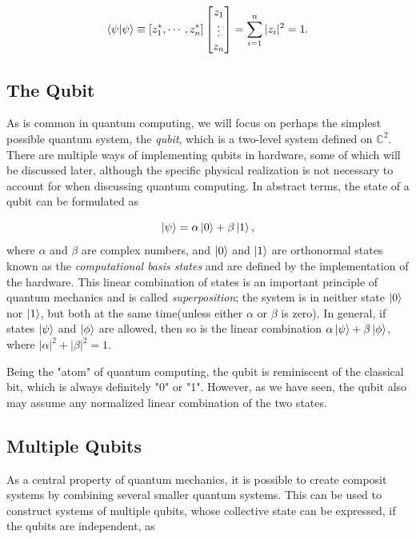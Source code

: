 \begin{equation}
    \braket{\psi}{\psi} \equiv [z_1^*, \cdots, z_n^*] 
    \begin{bmatrix}
        z_{1} \\
        \vdots \\
        z_{n}
    \end{bmatrix}
    = \sum_{i=1}^{n} |z_i|^2 = 1.
\end{equation}

\subsection{The Qubit}\label{sec:TheQubit}
As is common in quantum computing, we will focus on perhaps the simplest possible quantum system, the \emph{qubit}, which is a two-level system defined on $\mathbb{C}^2$.  There are multiple ways of implementing qubits in hardware, some of which will be discussed later, although  the specific physical realization is not necessary to account for when discussing quantum computing. In abstract terms, the state of a qubit can be formulated as

\begin{equation}
\ket{\psi} = \alpha \ket{0} + \beta \ket{1},
\end{equation}
where $\alpha$ and $\beta$ are complex numbers, and $\ket{0}$ and $\ket{1}$ are orthonormal states known as the \emph{computational basis states} and are defined by the implementation of the hardware. This linear combination of states is an important principle of quantum mechanics and is called \emph{superposition}; the system is in neither state $\ket{0}$ nor $\ket{1}$, but both at the same time(unless either $\alpha$ or $\beta$ is zero). In general, if states $\ket{\psi}$ and $\ket{\phi}$ are allowed, then so is the linear combination $\alpha \ket{\psi} + \beta \ket{\phi}$, where $|\alpha|^2 + |\beta|^2 = 1$.

Being the "atom" of quantum computing, the qubit is reminiscent of the classical bit, which is always definitely "0" or "1". However, as we have seen, the qubit also may assume any normalized linear combination of the two states.
\subsection{Multiple Qubits}\label{sec:Multiple Qubits}
As a central property of quantum mechanics, it is possible to create composit systems by combining several smaller quantum systems. This can be used to construct systems of multiple qubits, whose collective state can be expressed, if the qubits are independent, as

